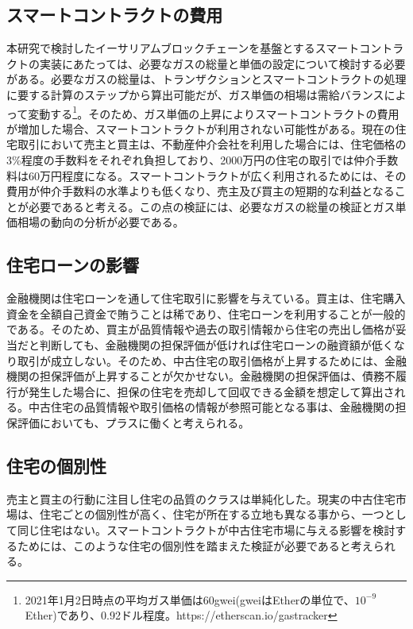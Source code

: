 \documentclass[a4paper,fontsize=11pt,report,notitlepage,line_length=38zw,number_of_lines=40,dvipdfmx]{jlreq}
\begin{document}
\subsection{スマートコントラクトの費用}
本研究で検討したイーサリアムブロックチェーンを基盤とするスマートコントラクトの実装にあたっては、必要なガスの総量と単価の設定について検討する必要がある。必要なガスの総量は、トランザクションとスマートコントラクトの処理に要する計算のステップから算出可能だが、ガス単価の相場は需給バランスによって変動する\footnote{2021年1月2日時点の平均ガス単価は60gwei(gweiはEtherの単位で、$10^{-9}$Ether)であり、0.92ドル程度。https://etherscan.io/gastracker}。そのため、ガス単価の上昇によりスマートコントラクトの費用が増加した場合、スマートコントラクトが利用されない可能性がある。現在の住宅取引において売主と買主は、不動産仲介会社を利用した場合には、住宅価格の3\%程度の手数料をそれぞれ負担しており、2000万円の住宅の取引では仲介手数料は60万円程度になる。スマートコントラクトが広く利用されるためには、その費用が仲介手数料の水準よりも低くなり、売主及び買主の短期的な利益となることが必要であると考える。この点の検証には、必要なガスの総量の検証とガス単価相場の動向の分析が必要である。

\subsection{住宅ローンの影響}
金融機関は住宅ローンを通して住宅取引に影響を与えている。買主は、住宅購入資金を全額自己資金で賄うことは稀であり、住宅ローンを利用することが一般的である。そのため、買主が品質情報や過去の取引情報から住宅の売出し価格が妥当だと判断しても、金融機関の担保評価が低ければ住宅ローンの融資額が低くなり取引が成立しない。そのため、中古住宅の取引価格が上昇するためには、金融機関の担保評価が上昇することが欠かせない。金融機関の担保評価は、債務不履行が発生した場合に、担保の住宅を売却して回収できる金額を想定して算出される。中古住宅の品質情報や取引価格の情報が参照可能となる事は、金融機関の担保評価においても、プラスに働くと考えられる。

\subsection{住宅の個別性}
売主と買主の行動に注目し住宅の品質のクラスは単純化した。現実の中古住宅市場は、住宅ごとの個別性が高く、住宅が所在する立地も異なる事から、一つとして同じ住宅はない。スマートコントラクトが中古住宅市場に与える影響を検討するためには、このような住宅の個別性を踏まえた検証が必要であると考えられる。




\end{document}
